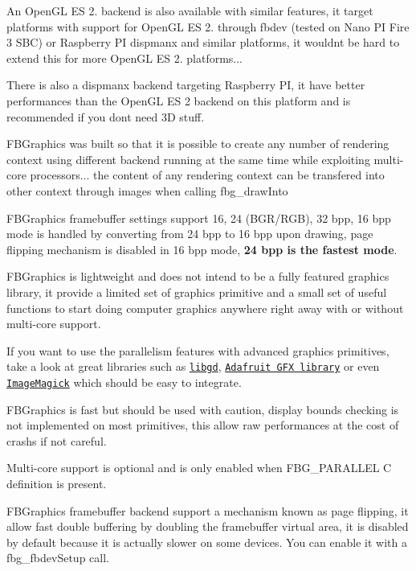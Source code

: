 An Open\+GL ES 2. backend is also available with similar features, it target platforms with support for Open\+GL ES 2. through fbdev (tested on Nano PI Fire 3 S\+BC) or Raspberry PI dispmanx and similar platforms, it wouldn\textquotesingle{}t be hard to extend this for more Open\+GL ES 2. platforms...

There is also a dispmanx backend targeting Raspberry PI, it have better performances than the Open\+GL ES 2 backend on this platform and is recommended if you don\textquotesingle{}t need 3D stuff.

F\+B\+Graphics was built so that it is possible to create any number of rendering context using different backend running at the same time while exploiting multi-\/core processors... the content of any rendering context can be transfered into other context through images when calling {\ttfamily fbg\+\_\+draw\+Into}

F\+B\+Graphics framebuffer settings support 16, 24 (B\+G\+R/\+R\+GB), 32 bpp, 16 bpp mode is handled by converting from 24 bpp to 16 bpp upon drawing, page flipping mechanism is disabled in 16 bpp mode, {\bfseries 24 bpp is the fastest mode}.

F\+B\+Graphics is lightweight and does not intend to be a fully featured graphics library, it provide a limited set of graphics primitive and a small set of useful functions to start doing computer graphics anywhere right away with or without multi-\/core support.

If you want to use the parallelism features with advanced graphics primitives, take a look at great libraries such as \href{http://libgd.github.io/}{\tt libgd}, \href{https://github.com/adafruit/Adafruit-GFX-Library}{\tt Adafruit G\+FX library} or even \href{https://imagemagick.org}{\tt Image\+Magick} which should be easy to integrate.

F\+B\+Graphics is fast but should be used with caution, display bounds checking is not implemented on most primitives, this allow raw performances at the cost of crashs if not careful.

Multi-\/core support is optional and is only enabled when {\ttfamily F\+B\+G\+\_\+\+P\+A\+R\+A\+L\+L\+EL} C definition is present.

F\+B\+Graphics framebuffer backend support a mechanism known as page flipping, it allow fast double buffering by doubling the framebuffer virtual area, it is disabled by default because it is actually slower on some devices. You can enable it with a {\ttfamily fbg\+\_\+fbdev\+Setup} call.


